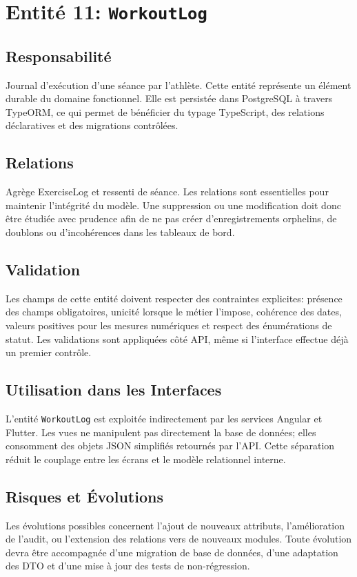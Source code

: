 \section{Entité 11: \texttt{WorkoutLog}}
\subsection{Responsabilité}
Journal d’exécution d’une séance par l’athlète. Cette entité représente un élément durable du domaine fonctionnel. Elle est persistée dans PostgreSQL à travers TypeORM, ce qui permet de bénéficier du typage TypeScript, des relations déclaratives et des migrations contrôlées.

\subsection{Relations}
Agrège ExerciseLog et ressenti de séance. Les relations sont essentielles pour maintenir l'intégrité du modèle. Une suppression ou une modification doit donc être étudiée avec prudence afin de ne pas créer d'enregistrements orphelins, de doublons ou d'incohérences dans les tableaux de bord.

\subsection{Validation}
Les champs de cette entité doivent respecter des contraintes explicites: présence des champs obligatoires, unicité lorsque le métier l'impose, cohérence des dates, valeurs positives pour les mesures numériques et respect des énumérations de statut. Les validations sont appliquées côté API, même si l'interface effectue déjà un premier contrôle.

\subsection{Utilisation dans les Interfaces}
L'entité \texttt{WorkoutLog} est exploitée indirectement par les services Angular et Flutter. Les vues ne manipulent pas directement la base de données; elles consomment des objets JSON simplifiés retournés par l'API. Cette séparation réduit le couplage entre les écrans et le modèle relationnel interne.

\subsection{Risques et Évolutions}
Les évolutions possibles concernent l'ajout de nouveaux attributs, l'amélioration de l'audit, ou l'extension des relations vers de nouveaux modules. Toute évolution devra être accompagnée d'une migration de base de données, d'une adaptation des DTO et d'une mise à jour des tests de non-régression.

